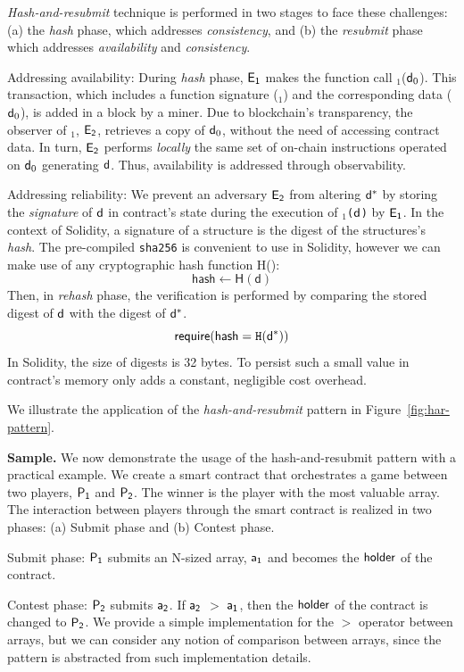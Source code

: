 \noindent
\emph{Hash-and-resubmit} technique is performed in two
stages to face these challenges: (a) the \emph{hash} phase, which addresses
\emph{consistency}, and (b) the \emph{resubmit} phase which addresses
\emph{availability} and \emph{consistency}.

\noindent \textsf{Addressing availability:} During \emph{hash} phase,
$\mathsf{E_{1}}$ makes the function call \texttt{\proc}$_1$($\mathsf{d}_0$). This
transaction, which includes a function signature (\texttt{\proc$_1$}) and the
corresponding data ($\mathsf{d}_0$), is added in a block by a miner. Due to
blockchain's transparency, the observer of \texttt{\proc}$_1$, $\mathsf{E_{2}}$,
retrieves a copy of $\mathsf{d}_0$, without the need of accessing contract data. In
turn, $\mathsf{E_{2}}$ performs \emph{locally} the same set of on-chain instructions
operated on $\mathsf{d}_0$ generating $\mathsf{d}$. Thus, availability is addressed
through observability.

\noindent \textsf{Addressing reliability:} We prevent an adversary $\mathsf{E_{2}}$
from altering $\mathsf{d^*}$ by storing the \emph{signature} of $\mathsf{d}$ in contract's
state during the execution of \texttt{\proc$_1$($\mathsf{d}$)} by $\mathsf{E_{1}}$. In the
context of Solidity, a signature of a structure is the digest of the
structures's \emph{hash}. The pre-compiled \texttt{sha256} is convenient to use
in Solidity, however we can make use of any cryptographic hash function
\textsf{H()}: \[\textsf{hash} \gets \textsf{H}(\textsf{d})\] Then, in
\emph{rehash} phase, the verification is performed by comparing the stored
digest of $\mathsf{d}$ with the digest of $\mathsf{d^*}$.
\[\textsf{require}(\textsf{hash} = \texttt{H}(\mathsf{d^*}))\] \noindent In Solidity,
the size of digests is 32 bytes. To persist such a small value in contract's
memory only adds a constant, negligible cost overhead.

We illustrate the application of the \emph{hash-and-resubmit} pattern in
Figure~\ref{fig:har-pattern}.

\noindent \textbf{Sample.} We now demonstrate the usage of the
hash-and-resubmit pattern with a practical example. We create a smart contract
that orchestrates a game between two players, $\mathsf{P_1}$ and $\mathsf{P_2}$. The winner is
the player with the most valuable array. The interaction between players
through the smart contract is realized in two phases: (a) Submit phase and (b)
Contest phase.

\noindent \textsf{Submit phase:} $\mathsf{P_1}$ submits an N-sized array, $\mathsf{a_1}$ and
becomes the $\mathsf{holder}$ of the contract.

\noindent \textsf{Contest phase:} $\mathsf{P_2}$ submits $\mathsf{a_2}$. If $\mathsf{a_2}$ $>$
$\mathsf{a_1}$, then the $\mathsf{holder}$ of the contract is changed to $\mathsf{P_2}$. We provide a
simple implementation for the $>$ operator between arrays, but we can consider
any notion of comparison between arrays, since the pattern is abstracted from
such implementation details.

